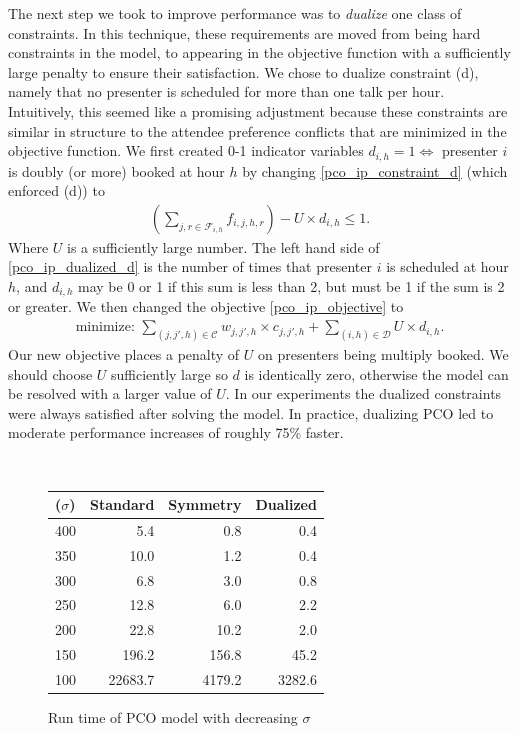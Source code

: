 \documentclass{svjour3}                     %
\begin{document}
The next step we took to improve performance was to \emph{dualize} one class of constraints.
In this technique, these requirements are moved from being hard constraints in the model, to appearing in the objective function with a sufficiently large penalty to ensure their satisfaction.
We chose to dualize constraint (d), namely that no presenter is scheduled for more than one talk per hour. 
Intuitively, this seemed like a promising adjustment because these constraints are similar in structure to the attendee preference conflicts that are minimized in the objective function.
We first created 0-1 indicator variables $d_{i,h} = 1 \iff $ presenter $i$ is doubly (or more) booked at hour $h$ by changing \eqref{pco_ip_constraint_d} (which enforced (d)) to
\begin{gather}
	\left( \sum_{j,r \in \mathcal F_{i,h}} f_{i,j,h,r} \right) - U \times d_{i,h} \le 1. \label{pco_ip_dualized_d}
\end{gather}
Where $U$ is a sufficiently large number.
The left hand side of \eqref{pco_ip_dualized_d} is the number of times that presenter $i$ is scheduled at hour $h$, and $d_{i,h}$ may be 0 or 1 if this sum is less than 2, but must be 1 if the sum is 2 or greater. 
We then changed the objective \eqref{pco_ip_objective} to 
\begin{gather}
	\text{minimize: } \sum_{(j,j',h) \in \mathcal C} w_{j,j',h} \times c_{j,j',h} + \sum_{(i,h) \in \mathcal D} U \times d_{i,h}.
\end{gather}
Our new objective places a penalty of $U$ on presenters being multiply booked.
We should choose $U$ sufficiently large so $d$ is identically zero, otherwise the model can be resolved with a larger value of $U$. 
In our experiments the dualized constraints were always satisfied after solving the model.
In practice, dualizing PCO led to moderate performance increases of roughly 75\% faster.

\begin{figure}[h!]	
	\caption{Run time of PCO model with decreasing $\sigma$}
	\centering
	 \\
	\begin{tabular}{| l | r | r | r |}
		\hline
		 ($\sigma$) & Standard & Symmetry & Dualized \\ \hline
		 400 & 5.4 & 0.8 & 0.4 \\
		 350 & 10.0 & 1.2 & 0.4 \\
		 300 & 6.8 & 3.0 & 0.8\\
		 250 &12.8 &6.0 &2.2 \\
		 200 & 22.8 & 10.2 &2.0\\
		 150 & 196.2 & 156.8 & 45.2 \\
		 100 & 22683.7 & 4179.2 &3282.6 \\
		\hline
	\end{tabular}	
	\label{2013_normal_sigma_run_time}
\end{figure}
\end{document}
